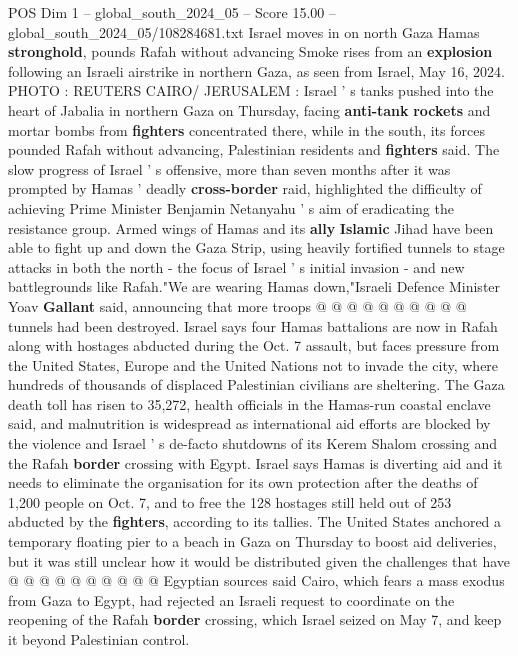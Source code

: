 \begin{textsample}{POS Dim 1 – global\_south\_2024\_05 – Score 15.00 – global\_south\_2024\_05/108284681.txt}  \label{ex:f1_pos_245}
Israel moves in on north Gaza Hamas \textbf{stronghold}, pounds Rafah without advancing Smoke rises from an \textbf{explosion} following an Israeli airstrike in northern Gaza, as seen from Israel, May 16, 2024.
PHOTO : REUTERS CAIRO/ JERUSALEM : Israel ' s tanks pushed into the heart of Jabalia in northern Gaza on Thursday, facing \textbf{anti-tank} \textbf{rockets} and mortar bombs from \textbf{fighters} concentrated there, while in the south, its forces pounded Rafah without advancing, Palestinian residents and \textbf{fighters} said.
The slow progress of Israel ' s offensive, more than seven months after it was prompted by Hamas ' deadly \textbf{cross-border} raid, highlighted the difficulty of achieving Prime Minister Benjamin Netanyahu ' s aim of eradicating the resistance group.
Armed wings of Hamas and its \textbf{ally} \textbf{Islamic} Jihad have been able to fight up and down the Gaza Strip, using heavily fortified tunnels to stage attacks in both the north - the focus of Israel ' s initial invasion - and new battlegrounds like Rafah."We are wearing Hamas down,"Israeli Defence Minister Yoav \textbf{Gallant} said, announcing that more troops @ @ @ @ @ @ @ @ @ @ tunnels had been destroyed.
Israel says four Hamas battalions are now in Rafah along with hostages abducted during the Oct. 7 assault, but faces pressure from the United States, Europe and the United Nations not to invade the city, where hundreds of thousands of displaced Palestinian civilians are sheltering.
The Gaza death toll has risen to 35,272, health officials in the Hamas-run coastal enclave said, and malnutrition is widespread as international aid efforts are blocked by the violence and Israel ' s de-facto shutdowns of its Kerem Shalom crossing and the Rafah \textbf{border} crossing with Egypt.
Israel says Hamas is diverting aid and it needs to eliminate the organisation for its own protection after the deaths of 1,200 people on Oct. 7, and to free the 128 hostages still held out of 253 abducted by the \textbf{fighters}, according to its tallies.
The United States anchored a temporary floating pier to a beach in Gaza on Thursday to boost aid deliveries, but it was still unclear how it would be distributed given the challenges that have @ @ @ @ @ @ @ @ @ @ Egyptian sources said Cairo, which fears a mass exodus from Gaza to Egypt, had rejected an Israeli request to coordinate on the reopening of the Rafah \textbf{border} crossing, which Israel seized on May 7, and keep it beyond Palestinian control.

\end{textsample}
